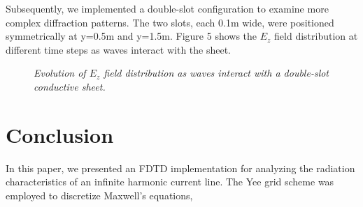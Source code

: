 \documentclass[journal]{IEEEtran}
\begin{document}
Subsequently, we implemented a double-slot configuration to examine more complex diffraction patterns. 
The two slots, each 0.1m wide, were positioned symmetrically at y=0.5m and y=1.5m. Figure 5 shows the $E_z$ field distribution at different time steps as waves interact with the sheet.
\begin{figure}[htbp]
    \centering
    \hfill
    \hfill
    \hfill
    \caption{\small\textit{Evolution of $E_z$ field distribution as waves interact with a double-slot conductive sheet. }}
    \label{fig:double_slot}
\end{figure}

\section{Conclusion}
In this paper, we presented an FDTD implementation for analyzing the radiation characteristics of an infinite harmonic current line.
The Yee grid scheme was employed to discretize Maxwell's equations, 
\end{document}
